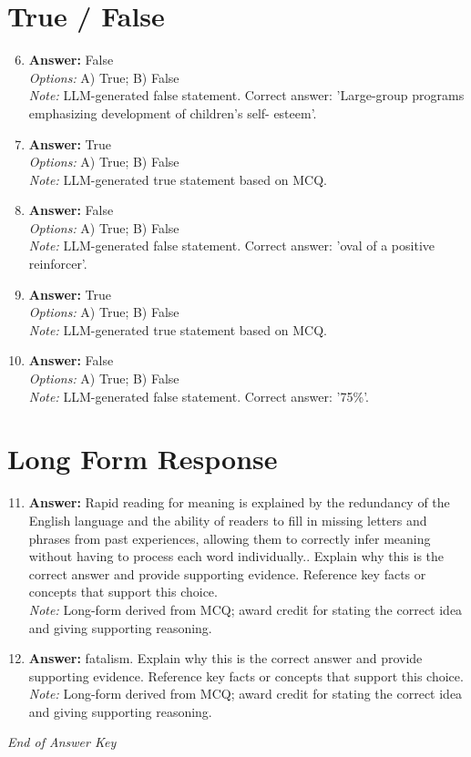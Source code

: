 \documentclass[12pt]{article}
\begin{document}
\section*{True / False}
\begin{enumerate}[label=\arabic*.]
\setcounter{enumi}{5}
\item \textbf{Answer:} False
\\ \textit{Options:} A) True; B) False
\\ \textit{Note:} LLM-generated false statement. Correct answer: 'Large-group programs emphasizing development of children's self- esteem'.
\item \textbf{Answer:} True
\\ \textit{Options:} A) True; B) False
\\ \textit{Note:} LLM-generated true statement based on MCQ.
\item \textbf{Answer:} False
\\ \textit{Options:} A) True; B) False
\\ \textit{Note:} LLM-generated false statement. Correct answer: 'oval of a positive reinforcer'.
\item \textbf{Answer:} True
\\ \textit{Options:} A) True; B) False
\\ \textit{Note:} LLM-generated true statement based on MCQ.
\item \textbf{Answer:} False
\\ \textit{Options:} A) True; B) False
\\ \textit{Note:} LLM-generated false statement. Correct answer: '75\%'.
\end{enumerate}

\section*{Long Form Response}
\begin{enumerate}[label=\arabic*.]
\setcounter{enumi}{10}
\item \textbf{Answer:} Rapid reading for meaning is explained by the redundancy of the English language and the ability of readers to fill in missing letters and phrases from past experiences, allowing them to correctly infer meaning without having to process each word individually.. Explain why this is the correct answer and provide supporting evidence. Reference key facts or concepts that support this choice.
\\ \textit{Note:} Long-form derived from MCQ; award credit for stating the correct idea and giving supporting reasoning.
\item \textbf{Answer:} fatalism. Explain why this is the correct answer and provide supporting evidence. Reference key facts or concepts that support this choice.
\\ \textit{Note:} Long-form derived from MCQ; award credit for stating the correct idea and giving supporting reasoning.
\end{enumerate}

\vfill
\noindent\textit{End of Answer Key}
\end{document}
